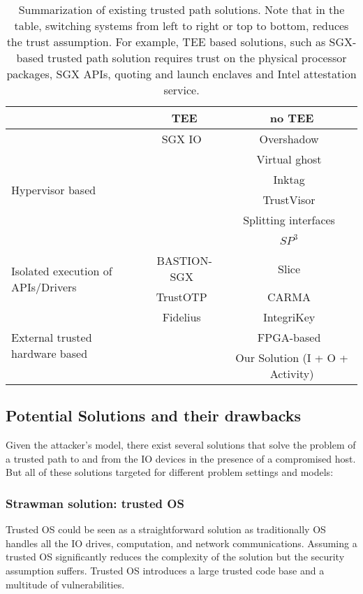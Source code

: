 \begin{table*}[t]
\small
\centering
  \begin{tabular}{ | l | c | c |}
    \hline
     & TEE & no TEE \\ \hline
    \multirow{6}{*}{Hypervisor based} & SGX IO~\cite{weiser2017sgxio} & Overshadow~\cite{Overshadow} \\ 
    & & Virtual ghost~\cite{criswell2014virtual}\\ 
    & & Inktag~\cite{hofmann2013inktag}\\ 
    & & TrustVisor~\cite{mccune2010trustvisor} \\ 
    & & Splitting interfaces~\cite{ta2006splitting}\\ 
    & & $SP^3$~\cite{yang2008using}\\ \hline
   \multirow{2}{*}{Isolated execution of APIs/Drivers} & BASTION-SGX~\cite{BASTION-SGX} & Slice~\cite{azab2011sice}\\ 
    & TrustOTP~\cite{sun2015trustotp} & CARMA~\cite{vasudevan2012carma} \\ \hline
    \multirow{3}{*}{External trusted hardware based} & Fidelius~\cite{Fidelius} & IntegriKey~\cite{IntegriKey} \\
    &  & FPGA-based~\cite{brandon2017trusted} \\
    &  & \textcolor{OliveGreen}{Our Solution (I + O + Activity)} \\
    \hline
  \end{tabular}
  \caption{Summarization of existing trusted path solutions. Note that in the table, switching systems from left to right or top to bottom, reduces the trust assumption. For example, TEE based solutions, such as SGX-based trusted path solution requires trust on the physical processor packages, SGX APIs, quoting and launch enclaves and Intel attestation service.}
\end{table*}


\subsection{Potential Solutions and their drawbacks}

Given the attacker's model, there exist several solutions that solve the problem of a trusted path to and from the IO devices in the presence of a compromised host. But all of these solutions targeted for different problem settings and models:

\subsubsection{Strawman solution: trusted OS} Trusted OS could be seen as a straightforward solution as traditionally OS handles all the IO drives, computation, and network communications. Assuming a trusted OS significantly reduces the complexity of the solution but the security assumption suffers. Trusted OS introduces a large trusted code base and a multitude of vulnerabilities. 

